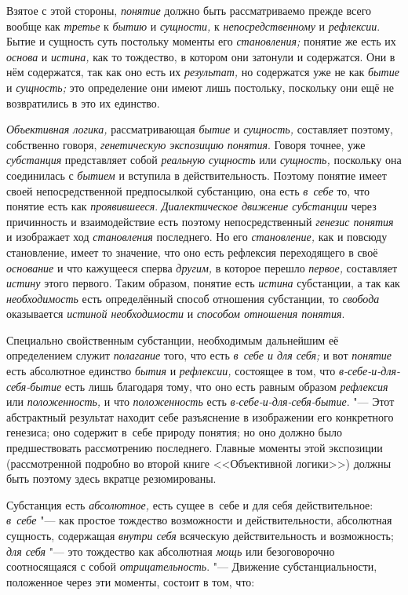 Взятое с этой стороны, {\em понятие} должно быть рассматриваемо прежде всего
вообще как {\em третье} к {\em бытию} и {\em сущности,} к
{\em непосредственному} и {\em рефлексии}. Бытие и сущность суть постольку
моменты его {\em становления;} понятие же есть их {\em основа} и
{\em истина,} как то тождество, в котором они затонули и содержатся. Они в
нём содержатся, так как оно есть их {\em результат,} но содержатся уже не
как {\em бытие} и {\em сущность;} это определение они имеют лишь постольку,
поскольку они ещё не возвратились в это их единство.

{\em Объективная логика,} рассматривающая {\em бытие} и {\em сущность,}
составляет поэтому, собственно говоря, {\em генетическую экспозицию понятия}.
Говоря точнее, уже {\em субстанция} представляет собой {\em реальную сущность}
или {\em сущность,} поскольку она соединилась с {\em бытием} и вступила в
действительность. Поэтому понятие имеет своей непосредственной предпосылкой
субстанцию, она есть {\em в~себе} то, что понятие есть как {\em проявившееся}.
{\em Диалектическое движение субстанции} через причинность и взаимодействие
есть поэтому непосредственный {\em генезис понятия} и изображает ход
{\em становления} последнего. Но его {\em становление,} как и
повсюду становление, имеет то значение, что оно есть рефлексия переходящего
в своё {\em основание} и что кажущееся сперва {\em другим,} в которое перешло
{\em первое,} составляет {\em истину} этого первого. Таким образом, понятие есть
{\em истина} субстанции, а так как {\em необходимость} есть определённый
способ отношения субстанции, то {\em свобода} оказывается {\em истиной
необходимости} и {\em способом отношения понятия}.

Специально свойственным субстанции, необходимым дальнейшим её определением
служит {\em полагание} того, что есть {\em в~себе и для себя;} и вот
{\em понятие} есть абсолютное единство {\em бытия} и {\em рефлексии,}
состоящее в том, что {\em в-себе-и-для-себя-бытие} есть лишь благодаря тому,
что оно есть равным образом {\em рефлексия} или {\em положенность,} и что
{\em положенность} есть {\em в-себе-и-для-себя-бытие}. "--- Этот абстрактный
результат находит себе разъяснение в изображении его конкретного генезиса;
оно содержит в~себе природу понятия; но оно должно было предшествовать
рассмотрению последнего. Главные моменты этой экспозиции (рассмотренной
подробно во второй книге <<Объективной логики>>) должны быть поэтому здесь
вкратце резюмированы.

Субстанция есть {\em абсолютное,} есть сущее в~себе и для себя
действительное: {\em в~себе} "--- как простое тождество возможности и
действительности, абсолютная сущность, содержащая {\em внутри себя}
всяческую действительность и возможность; {\em для себя} "--- это
тождество как абсолютная {\em мощь} или безоговорочно соотносящаяся с собой
{\em отрицательность}. "--- Движение субстанциальности, положенное через эти
моменты, состоит в том, что:

